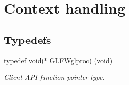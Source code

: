 \hypertarget{group__context}{}\section{Context handling}
\label{group__context}
\subsection*{Typedefs}
\begin{DoxyCompactItemize}
\item 
typedef void($\ast$ \hyperlink{group__context_ga3d47c2d2fbe0be9c505d0e04e91a133c}{G\+L\+F\+Wglproc}) (void)
\begin{DoxyCompactList}\small\item\em Client A\+P\+I function pointer type. \end{DoxyCompactList}\end{DoxyCompactItemize}

